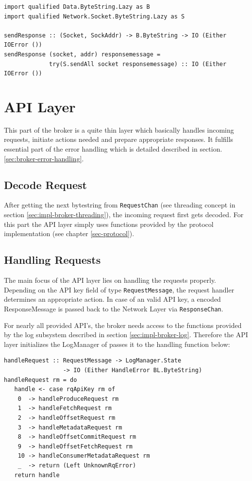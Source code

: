 \begin{lstlisting}
import qualified Data.ByteString.Lazy as B
import qualified Network.Socket.ByteString.Lazy as S

sendResponse :: (Socket, SockAddr) -> B.ByteString -> IO (Either IOError ())
sendResponse (socket, addr) responsemessage = 
             try(S.sendAll socket responsemessage) :: IO (Either IOError ())
\end{lstlisting}

\newpage
\section{API Layer}
\label{sec:broker-api}
This part of the broker is a quite thin layer which basically handles incoming
requests, initiate actions needed and prepare appropriate responses. It fulfills
essential part of the error handling which is detailed described in section. 
\ref{sec:broker-error-handling}. 

\subsection{Decode Request}
\label{sec:impl-broker-api-handle}
After getting the next bytestring from \lstinline{RequestChan} (see threading
concept in section \ref{sec:impl-broker-threading}), the incoming request first
gets decoded. For this part the API layer simply uses functions provided by the
protocol implementation (see chapter \ref{sec-protocol}).

\subsection{Handling Requests}
The main focus of the API layer lies on handling the
requests properly. Depending on the API key field of type
\lstinline{RequestMessage}, the
request handler determines an appropriate action. In case of an valid API key,
a encoded ResponseMessage is passed back to the Network Layer via
\lstinline{ResponseChan}.

For nearly all provided API's, the broker needs access to the functions provided
by the log subsystem described in section \ref{sec:impl-broker-log}. Therefore the
API layer initializes the LogManager of passes it to the handling function
below:
\begin{lstlisting}
handleRequest :: RequestMessage -> LogManager.State 
                 -> IO (Either HandleError BL.ByteString)
handleRequest rm = do
   handle <- case rqApiKey rm of
    0  -> handleProduceRequest rm
    1  -> handleFetchRequest rm
    2  -> handleOffsetRequest rm
    3  -> handleMetadataRequest rm
    8  -> handleOffsetCommitRequest rm
    9  -> handleOffsetFetchRequest rm
    10 -> handleConsumerMetadataRequest rm
    _  -> return (Left UnknownRqError)
   return handle
\end{lstlisting}

